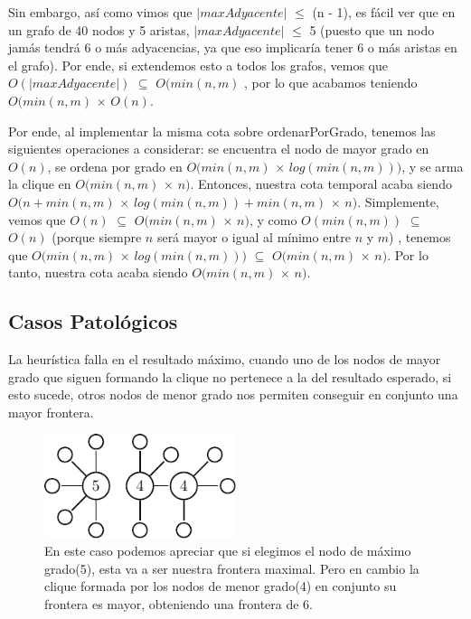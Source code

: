 Sin embargo, así como vimos que $|maxAdyacente|$ $\leq$ (n - 1), es fácil ver que en un grafo de 40 nodos y 5 aristas, $|maxAdyacente|$ $\leq$ 5 (puesto que un nodo jamás tendrá 6 o más adyacencias, ya que eso implicaría tener 6 o más aristas en el grafo). Por ende, si extendemos esto a todos los grafos, vemos que $O(|maxAdyacente|)$ $\subseteq$ $O(min(n,m)$ , por lo que acabamos teniendo $O(min(n,m)$ $\times$ $O(n)$.

Por ende, al implementar la misma cota sobre ordenarPorGrado, tenemos las siguientes operaciones a considerar: se encuentra el nodo de mayor grado en $O(n)$, se ordena por grado en $O(min(n,m)$ $\times$ $log(min(n,m)))$, y se arma la clique en $O(min(n,m)$ $\times$ $n )$.  Entonces, nuestra cota temporal acaba siendo $O(n + min(n,m)$ $\times$ $log(min(n,m)) + min(n,m)$ $\times$ $n )$. Simplemente, vemos que $O(n)$ $\subseteq$ $O(min(n,m)$ $\times$ $n )$, y como $O(min(n,m))$ $\subseteq$ $O(n)$ (porque siempre $n$ será mayor o igual al mínimo entre $n$ y $m$) , tenemos que $O(min(n,m)$ $\times$ $log(min(n,m)))$ $\subseteq$ $O(min(n,m)$ $\times$ $n )$. Por lo tanto, nuestra cota acaba siendo $O(min(n,m)$ $\times$ $n )$.

\subsection{Casos Patológicos}

La heurística falla en el resultado máximo, cuando uno de los nodos de mayor grado que siguen formando la clique no pertenece a la del resultado esperado, si esto sucede, otros nodos de menor grado nos permiten conseguir en conjunto una mayor frontera.

\begin{figure}
\caption{En este caso podemos apreciar que si elegimos el nodo de máximo grado(5), esta va a ser nuestra frontera maximal. Pero en cambio la clique formada por los nodos de menor grado(4) en conjunto su frontera es mayor, obteniendo una frontera de 6.}
\includegraphics[width=0.5\textwidth]{img/patologic.pdf}
\end{figure}

